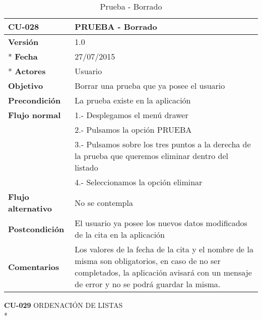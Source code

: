 \documentclass[../pfc.tex]{subfiles}
\begin{document}
	\begin{table}[H]
		\centering
		\begin{tabular}[t]{|p{3cm}|p{9.5cm}|}
			\hline \textbf{CU-028} & \textbf{PRUEBA - Borrado} \\*
			\hline\hline \textbf{Versión} & 1.0 \\ *
			\hline\hline \textbf{Fecha} & 27/07/2015 \\ *
			\hline\textbf{Actores} 	& Usuario\\*
			\hline \textbf{Objetivo} & Borrar una prueba que ya posee el usuario\\* 			
			\hline \textbf{Precondición} & La prueba existe en la aplicación\\* 
			\hline \textbf{Flujo normal} & 1.- Desplegamos el menú drawer \\* 
			& 2.- Pulsamos la opción PRUEBA\\*	
			& 3.- Pulsamos sobre los tres puntos a la derecha de la prueba que queremos eliminar dentro del listado\\*	
			& 4.- Seleccionamos la opción eliminar\\*	
			\hline \textbf{Flujo alternativo} & No se contempla \\* 
			\hline \textbf{Postcondición} & El usuario ya posee los nuevos datos modificados de la cita en la aplicación \\* 
			\hline \textbf{Comentarios}   & Los valores de la fecha de la cita y el nombre de la misma son obligatorios, en caso de no ser completados, la aplicación avisará con un mensaje de error y no se podrá guardar la misma.\\*
			\hline
		\end{tabular}
		\caption{Prueba - Borrado}
		\label{tabla:caso028}
	\end{table}

	
	
	\textbf{CU-029}	ORDENACIÓN DE LISTAS\\* 
	
\end{document}
